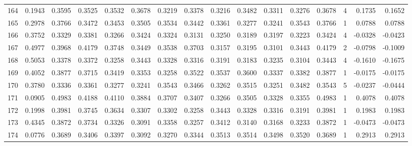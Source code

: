 \begin{tabular}{lrrrrrrrrrrrrrrr}
164 &      0.1943 &  0.3595 &  0.3525 &  0.3532 &  0.3678 &  0.3219 &  0.3378 &  0.3216 &  0.3482 &  0.3311 &   0.3276 &     0.3678 &      4 &                    0.1735 &                     0.1652 \\
165 &      0.2978 &  0.3766 &  0.3472 &  0.3453 &  0.3505 &  0.3534 &  0.3442 &  0.3361 &  0.3277 &  0.3241 &   0.3543 &     0.3766 &      1 &                    0.0788 &                     0.0788 \\
166 &      0.3752 &  0.3329 &  0.3381 &  0.3266 &  0.3424 &  0.3324 &  0.3131 &  0.3250 &  0.3189 &  0.3197 &   0.3223 &     0.3424 &      4 &                   -0.0328 &                    -0.0423 \\
167 &      0.4977 &  0.3968 &  0.4179 &  0.3748 &  0.3449 &  0.3538 &  0.3703 &  0.3157 &  0.3195 &  0.3101 &   0.3443 &     0.4179 &      2 &                   -0.0798 &                    -0.1009 \\
168 &      0.5053 &  0.3378 &  0.3372 &  0.3258 &  0.3443 &  0.3328 &  0.3316 &  0.3191 &  0.3183 &  0.3235 &   0.3104 &     0.3443 &      4 &                   -0.1610 &                    -0.1675 \\
169 &      0.4052 &  0.3877 &  0.3715 &  0.3419 &  0.3353 &  0.3258 &  0.3522 &  0.3537 &  0.3600 &  0.3337 &   0.3382 &     0.3877 &      1 &                   -0.0175 &                    -0.0175 \\
170 &      0.3780 &  0.3336 &  0.3361 &  0.3277 &  0.3241 &  0.3543 &  0.3466 &  0.3262 &  0.3515 &  0.3251 &   0.3482 &     0.3543 &      5 &                   -0.0237 &                    -0.0444 \\
171 &      0.0905 &  0.4983 &  0.4188 &  0.4110 &  0.3884 &  0.3707 &  0.3407 &  0.3266 &  0.3505 &  0.3328 &   0.3355 &     0.4983 &      1 &                    0.4078 &                     0.4078 \\
172 &      0.1998 &  0.3981 &  0.3745 &  0.3634 &  0.3307 &  0.3302 &  0.3258 &  0.3443 &  0.3328 &  0.3316 &   0.3191 &     0.3981 &      1 &                    0.1983 &                     0.1983 \\
173 &      0.4345 &  0.3872 &  0.3734 &  0.3326 &  0.3091 &  0.3358 &  0.3257 &  0.3412 &  0.3140 &  0.3168 &   0.3233 &     0.3872 &      1 &                   -0.0473 &                    -0.0473 \\
174 &      0.0776 &  0.3689 &  0.3406 &  0.3397 &  0.3092 &  0.3270 &  0.3344 &  0.3513 &  0.3514 &  0.3498 &   0.3520 &     0.3689 &      1 &                    0.2913 &                     0.2913 \\

\end{tabular}
